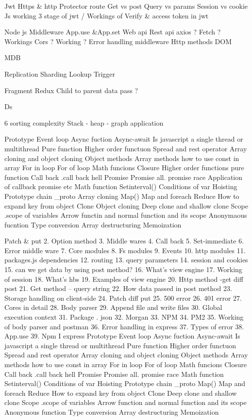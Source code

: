 
Jwt 
Https & http
Protector route
Get vs post
Query vs params
Session vs cookie
Js working
3 stage of jwt /
Workings of Verify & access token in jwt 


Node js
Middleware
App.use &App.set
Web api
Rest api
axios ? Fetch ? Workings
Cors ? Working ?
Error handling middleware
Http methods
DOM 

MDB

Replication
Sharding
Lookup
Trigger



Fragment
Redux
Child to parent data pass ?


Ds 

6 sorting complexity 
Stack - heap - graph application

Prototype
Event loop
Async fuction
Async-await
Is javascript a single thread or multithread
Pure function
Higher order functuon
Spread and rest operator
Array cloning  and object cloning
Object methods
Array methods
 how to use const in array
For in loop
For of loop
Math funcions
Closure
Higher order functions pure function
Call back
.call back hell
Promise
Promise all.
promise race
Application of callback promise etc
Math function
Setinterval()
Conditions of var
Hoisting
Prototype chain
_proto
Array cloning
Map()
Map and foreach
Reduce
How to expand key from object
Clone
Object cloning
Deep clone and shallow clone
Scope
.scope of variables
Arrow functin and normal function and its scope
Anonymaous fucntion
Type conversion
Array destructuring
Memoization

Patch & put 
2.	Option method 
3.	Middle wares
4.	Call back
5.	 Set-immediate
6.	Error middle ware 
7.	Core modules 
8.	Fs modules 
9.	Events
10.	http modules
11.	packages.js dependencies
12.	routing
13.	query parameters
14.	session and cookies
15.	can we get data by using post method?
16.	What’s view engine
17.	Working of session
18.	What’s hbs
19.	Examples of view engine
20.	Http method -get diff post 
21.	Get method – query string
22.	How data passed in post method
23.	Storage handling on client-side
24.	Patch diff put 
25.	500 error
26.	401 error
27.	Cores in detail
28.	Body parser
29.	Append file and write files
30.	Global execution context
31.	Package . json
32.	Morgan
33.	NPM 
34.	PM2 
35.	Working of body parser and postman
36.	Error handling in express
37.	Types of error 
38.	App.use
39.	Npm I express
Prototype
Event loop
Async fuction
Async-await
Is javascript a single thread or multithread
Pure function
Higher order functuon
Spread and rest operator
Array cloning  and object cloning
Object methods
Array methods
 how to use const in array
For in loop
For of loop
Math funcions
Closure
Call back
.call back hell
Promise
Promise all.
promise race
Math function
Setinterval()
Conditions of var
Hoisting
Prototype chain
_proto
Map()
Map and foreach
Reduce
How to expand key from object
Clone
Deep clone and shallow clone
Scope
.scope of variables
Arrow function and normal function and its scope
Anonymous function 
Type conversion
Array destructuring
Memoization

